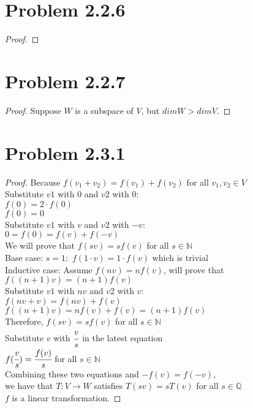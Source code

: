 \documentclass[12pt]{article}
\begin{document}
\newpage 

\section{Problem 2.2.6}

\begin{proof}
	
\end{proof}

\newpage 

\section{Problem 2.2.7}

\begin{proof}
	Suppose $W$ is a subspace of $V$, but $dimW > dimV$.
 
\end{proof}

\newpage 

\section{Problem 2.3.1}

\begin{proof}
	Because $f(v_1+v_2)=f(v_1)+f(v_2)$ for all $v_1, v_2 \in V$
 \\ Substitute $v1$ with $0$ and $v2$ with $0$: 
 \\ $f(0)=2 \cdot f(0)$
 \\ $f(0)=0$
 \\ Substitute $v1$ with $v$ and $v2$ with $-v$: 
 \\ $0=f(0)=f(v)+f(-v)$
 \\ We will prove that $f(sv)=sf(v)$ for all $s \in \mathbb{N}$
 \\ Base case: $s=1: $ $f(1\cdot v)=1 \cdot f(v)$ which is trivial
 \\ Inductive case: Assume $f(nv)=nf(v)$, will prove that $f((n+1)v)=(n+1)f(v)$
 \\Substitute $v1$ with $nv$ and $v2$ with $v$: 
 \\$f(nv+v)=f(nv)+f(v)$
 \\$f((n+1)v)=nf(v)+f(v)=(n+1)f(v)$
 \\Therefore, $f(sv)=sf(v)$ for all $s \in \mathbb{N}$
 \\Substitute $v$ with $\cfrac{v}{s}$ in the latest equation
 \\ $f(\cfrac{v}{s})=\cfrac{f(v)}{s}$ for all $s \in \mathbb{N}$
 \\Combining these two equations and $-f(v)=f(-v)$, \\we have that $T:V \rightarrow W$ satisfies $T(sv)=sT(v)$ for all $s \in \mathbb{Q}$
 \\ $f$ is a linear transformation.
\end{proof}
\end{document}
